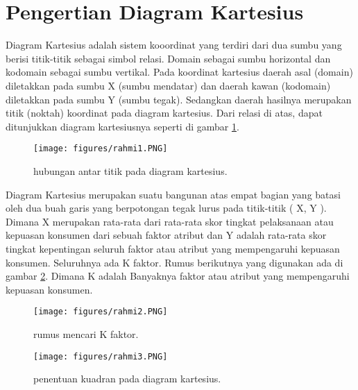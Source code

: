 
\section{Pengertian Diagram Kartesius}
Diagram Kartesius adalah sistem kooordinat yang terdiri dari dua sumbu yang berisi titik-titik sebagai simbol relasi.
Domain sebagai sumbu horizontal dan kodomain sebagai sumbu vertikal.
Pada koordinat kartesius daerah asal (domain) diletakkan pada sumbu X (sumbu mendatar) dan daerah kawan (kodomain) diletakkan pada sumbu Y (sumbu tegak).
Sedangkan daerah hasilnya merupakan titik (noktah) koordinat pada diagram kartesius. Dari relasi di atas, dapat ditunjukkan diagram kartesiusnya seperti di gambar \ref{rahmi1}.
\begin{figure}[ht]
	\centerline{\texttt{[image: figures/rahmi1.PNG]}}
	\caption{hubungan antar titik pada diagram kartesius.}
	\label{rahmi1}
	\end{figure}

Diagram Kartesius merupakan suatu bangunan atas empat bagian yang batasi oleh dua buah garis yang berpotongan tegak lurus pada titik-titik (  X, Y ). 
Dimana X merupakan rata-rata dari rata-rata skor tingkat pelaksanaan atau kepuasan konsumen dari sebuah faktor atribut 
dan Y adalah rata-rata skor tingkat kepentingan seluruh faktor atau atribut yang mempengaruhi kepuasan konsumen.
Seluruhnya ada K faktor. Rumus berikutnya yang digunakan ada di gambar \ref{rahmi2}. Dimana K adalah Banyaknya faktor atau atribut yang mempengaruhi kepuasan konsumen.
\begin{figure}[ht]
	\centerline{\texttt{[image: figures/rahmi2.PNG]}}
	\caption{rumus mencari K faktor.}
	\label{rahmi2}
	\end{figure}

\begin{figure}[ht]
	\centerline{\texttt{[image: figures/rahmi3.PNG]}}
	\caption{penentuan kuadran pada diagram kartesius.}
	\label{rahmi3}
\end{figure}


